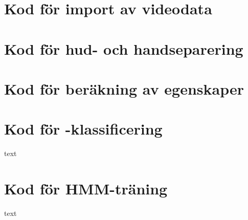 \documentclass[../rapport_MVEX01-11-05]{subfiles}
\begin{document}
\overfullrule=5mm

\section{Kod för import av videodata}


\section{Kod för hud- och handseparering}


\section{Kod för beräkning av egenskaper}\label{sec:matlab:features}


\section{Kod för \knn-klassificering}

text

\section{Kod för HMM-träning}

text
\end{document}
